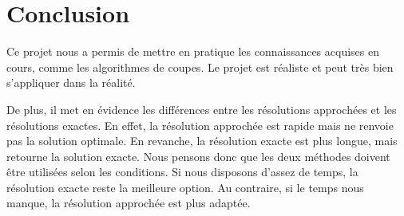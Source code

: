 \section{Conclusion}
\label{S conclusion}

Ce projet nous a permis de mettre en pratique les connaissances acquises en cours, comme les algorithmes de coupes. Le projet est réaliste et peut très bien s'appliquer dans la réalité.

De plus, il met en évidence les différences entre les résolutions approchées et les résolutions exactes. En effet, la résolution approchée est rapide mais ne renvoie pas la solution optimale. En revanche, la résolution exacte est plus longue, mais retourne la solution exacte. Nous pensons donc que les deux méthodes doivent être utilisées selon les conditions. Si nous disposons d'assez de temps, la résolution exacte reste la meilleure option. Au contraire, si le temps nous manque, la résolution approchée est plus adaptée.